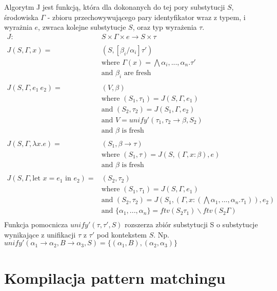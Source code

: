 \documentclass{article}
\begin{document}
Algorytm J jest funkcją, która dla dokonanych do tej pory substytucji $S$, środowiska $\Gamma$ - zbioru przechowywującego pary identyfikator wraz z typem, i wyrażnia $e$, zwraca kolejne substytucje $S$, oraz typ wyrażenia $\tau$.
\begin{equation}
  \begin{split}
    J :& S\times\Gamma\times e \rightarrow S\times\tau \\
    \\
    J(S,\Gamma,x) =& (S,[\beta_i/\alpha_i]\tau') \\
    &\text{where } \Gamma(x) = \bigwedge\alpha_i,...,\alpha_n.\tau' \\
    &\text{and } \beta_i \text{ are fresh} \\
    \\
    J(S,\Gamma,e_1\ e_2) =& (V,\beta) \\
    &\text{where } (S_1,\tau_1) = J(S,\Gamma,e_1) \\
    &\text{and } (S_2,\tau_2)=J(S_1,\Gamma,e_2) \\
    &\text{and } V = unify'(\tau_1,\tau_2\rightarrow\beta,S_2) \\
    &\text{and } \beta \text{ is fresh} \\
    \\
    J(S,\Gamma,\lambda x.e) =& (S_1,\beta\rightarrow\tau) \\
    &\text{where } (S_1,\tau)=J(S,(\Gamma,x:\beta),e) \\
    &\text{and } \beta \text{ is fresh} \\
    \\
    J(S,\Gamma,\text{let }x=e_1\text{ in }e_2) =& (S_2,\tau_2) \\
    &\text{where } (S_1,\tau_1)=J(S,\Gamma,e_1) \\
    &\text{and } (S_2,\tau_2)=J(S_1,(\Gamma,x:(\bigwedge\alpha_1,...,\alpha_n.\tau_1)),e_2) \\
    &\text{and } \{\alpha_1,...,\alpha_n\}=ftv(S_2\tau_1)\backslash ftv(S_2\Gamma) \\
  \end{split}
\end{equation}
Funkcja pomocnicza $unify'(\tau,\tau',S)$ rozszerza zbiór substytucji S o substytucje wynikające z unifikacji $\tau$ z $\tau'$ pod kontekstem $S$. Np. $unify'(\alpha_1\rightarrow\alpha_2,B\rightarrow\alpha_3,S) = \{(\alpha_1,B), (\alpha_2,\alpha_3)\}$

\section{Kompilacja pattern matchingu}
\end{document}
